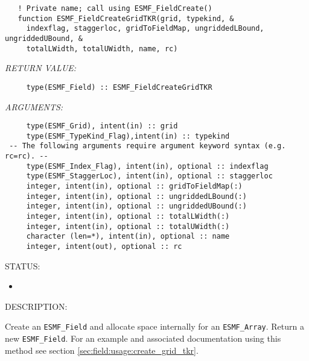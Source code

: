 \begin{verbatim}   ! Private name; call using ESMF_FieldCreate()
   function ESMF_FieldCreateGridTKR(grid, typekind, &
     indexflag, staggerloc, gridToFieldMap, ungriddedLBound, ungriddedUBound, &
     totalLWidth, totalUWidth, name, rc)\end{verbatim}{\em RETURN VALUE:}
\begin{verbatim}     type(ESMF_Field) :: ESMF_FieldCreateGridTKR\end{verbatim}{\em ARGUMENTS:}
\begin{verbatim}     type(ESMF_Grid), intent(in) :: grid
     type(ESMF_TypeKind_Flag),intent(in) :: typekind
 -- The following arguments require argument keyword syntax (e.g. rc=rc). --
     type(ESMF_Index_Flag), intent(in), optional :: indexflag
     type(ESMF_StaggerLoc), intent(in), optional :: staggerloc
     integer, intent(in), optional :: gridToFieldMap(:)
     integer, intent(in), optional :: ungriddedLBound(:)
     integer, intent(in), optional :: ungriddedUBound(:)
     integer, intent(in), optional :: totalLWidth(:)
     integer, intent(in), optional :: totalUWidth(:)
     character (len=*), intent(in), optional :: name
     integer, intent(out), optional :: rc\end{verbatim}
{\sf STATUS:}
   \begin{itemize}
   \item{}
   \end{itemize}
  
{\sf DESCRIPTION:\\ }


   Create an {\tt ESMF\_Field} and allocate space internally for an
   {\tt ESMF\_Array}. Return a new {\tt ESMF\_Field}. For an example and
   associated documentation using this method see section
   \ref{sec:field:usage:create_grid_tkr}.
  
